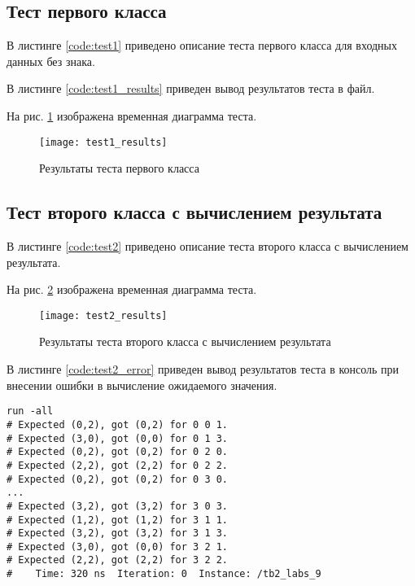 \subsection{Тест первого класса}

В листинге \ref{code:test1} приведено описание теста первого класса для входных данных без знака.


В листинге \ref{code:test1_results} приведен вывод результатов теста в файл.


На рис. \ref{fig:test1_results} изображена временная диаграмма теста.
\vspace{-0.5cm}
\begin{figure}[H]
	\begin{center}
		\texttt{[image: test1\_results]}
		\caption{Результаты теста первого класса}
		\label{fig:test1_results}
	\end{center}
\end{figure}
\vspace{-1cm}

\subsection{Тест второго класса с вычислением результата}

В листинге \ref{code:test2} приведено описание теста второго класса с вычислением результата.


На рис. \ref{fig:test2_results} изображена временная диаграмма теста.
\vspace{-0.5cm}
\begin{figure}[H]
	\begin{center}
		\texttt{[image: test2\_results]}
		\caption{Результаты теста второго класса с вычислением результата}
		\label{fig:test2_results}
	\end{center}
\end{figure}

В листинге \ref{code:test2_error} приведен вывод результатов теста в консоль при внесении ошибки в вычисление ожидаемого значения.	
\begin{lstlisting}[caption=Результаты ошибочного теста второго класса с вычислением результата, label=code:test2_error, style=console]
run -all
# Expected (0,2), got (0,2) for 0 0 1.
# Expected (3,0), got (0,0) for 0 1 3.
# Expected (0,2), got (0,2) for 0 2 0.
# Expected (2,2), got (2,2) for 0 2 2.
# Expected (0,2), got (0,2) for 0 3 0.
...
# Expected (3,2), got (3,2) for 3 0 3.
# Expected (1,2), got (1,2) for 3 1 1.
# Expected (3,2), got (3,2) for 3 1 3.
# Expected (3,0), got (0,0) for 3 2 1.
# Expected (2,2), got (2,2) for 3 2 2.
#    Time: 320 ns  Iteration: 0  Instance: /tb2_labs_9
\end{lstlisting}

